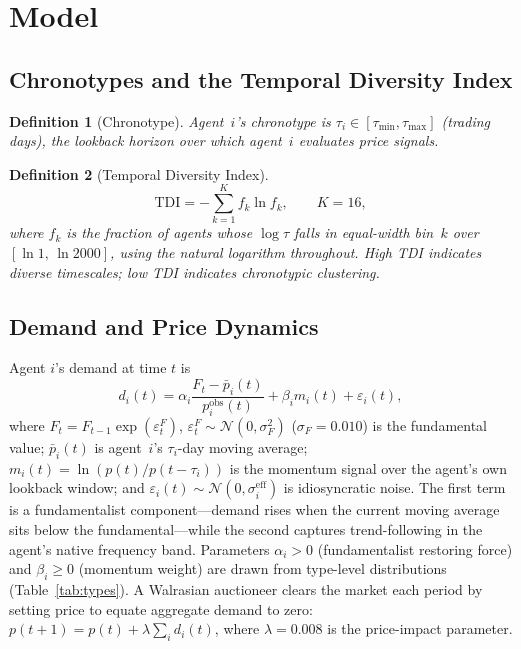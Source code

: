 \documentclass[preprint,12pt,authoryear]{elsarticle}
\newtheorem{definition}{Definition}
\begin{document}
\section{Model}
\label{sec:model}

\subsection{Chronotypes and the Temporal Diversity Index}

\begin{definition}[Chronotype]
Agent~$i$'s chronotype is $\tau_i \in [\tau_{\min}, \tau_{\max}]$
(trading days), the lookback horizon over which agent~$i$ evaluates
price signals.
\end{definition}

\begin{definition}[Temporal Diversity Index]
\[
  \mathrm{TDI} = -\sum_{k=1}^{K} f_k \ln f_k, \qquad K = 16,
\]
where $f_k$ is the fraction of agents whose $\log\tau$ falls in
equal-width bin~$k$ over $[\ln 1,\,\ln 2000]$, using the natural
logarithm throughout.
High TDI indicates diverse timescales; low TDI indicates chronotypic
clustering.
\end{definition}

\subsection{Demand and Price Dynamics}

Agent $i$'s demand at time $t$ is
\begin{equation}
  d_i(t) = \alpha_i \frac{F_t - \bar{p}_i(t)}{p^{\mathrm{obs}}_i(t)}
          + \beta_i m_i(t) + \varepsilon_i(t),
  \label{eq:demand}
\end{equation}
where $F_t = F_{t-1}\exp(\varepsilon_t^F)$, $\varepsilon_t^F \sim
\mathcal{N}(0,\sigma_F^2)$ ($\sigma_F = 0.010$) is the fundamental value;
$\bar{p}_i(t)$ is agent~$i$'s $\tau_i$-day moving average;
$m_i(t) = \ln(p(t)/p(t-\tau_i))$ is the momentum signal over
the agent's own lookback window; and
$\varepsilon_i(t) \sim \mathcal{N}(0,\sigma_i^{\mathrm{eff}})$ is
idiosyncratic noise.
The first term is a fundamentalist component---demand rises when the
current moving average sits below the fundamental---while the second
captures trend-following in the agent's native frequency band.
Parameters $\alpha_i > 0$ (fundamentalist restoring force) and
$\beta_i \geq 0$ (momentum weight) are drawn from type-level distributions
(Table~\ref{tab:types}).
A Walrasian auctioneer clears the market each period by setting price to
equate aggregate demand to zero: $p(t+1) = p(t) + \lambda \sum_i d_i(t)$,
where $\lambda = 0.008$ is the price-impact parameter.
\end{document}
